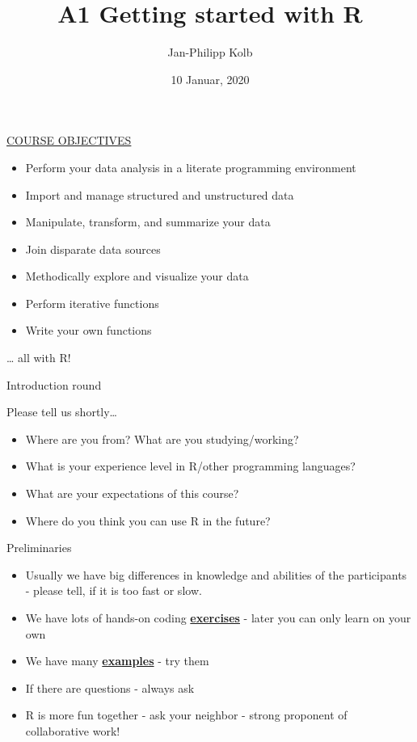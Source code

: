 \documentclass[
  10pt,
  ignorenonframetext,
]{beamer}
\title{A1 Getting started with R}
\author{Jan-Philipp Kolb}
\date{10 Januar, 2020}
\providecommand{\tightlist}{%
  \setlength{\itemsep}{0pt}\setlength{\parskip}{0pt}}
\begin{document}
\frame{\titlepage}

\begin{frame}{\href{http://uc-r.github.io/data_wrangling/week-1}{COURSE
OBJECTIVES}}
\protect\hypertarget{course-objectives}{}

\begin{itemize}
\tightlist
\item
  Perform your data analysis in a literate programming environment
\item
  Import and manage structured and unstructured data
\item
  Manipulate, transform, and summarize your data
\item
  Join disparate data sources
\item
  Methodically explore and visualize your data
\item
  Perform iterative functions
\item
  Write your own functions
\end{itemize}

\ldots{} all with R!

\end{frame}

\begin{frame}{Introduction round}
\protect\hypertarget{introduction-round}{}

\begin{block}{Please tell us shortly\ldots{}}

\begin{itemize}
\tightlist
\item
  Where are you from? What are you studying/working?
\item
  What is your experience level in R/other programming languages?
\item
  What are your expectations of this course?
\item
  Where do you think you can use R in the future?
\end{itemize}

\end{block}

\end{frame}

\begin{frame}{Preliminaries}
\protect\hypertarget{preliminaries}{}

\begin{itemize}
\tightlist
\item
  Usually we have big differences in knowledge and abilities of the
  participants - please tell, if it is too fast or slow.
\item
  We have lots of hands-on coding
  \href{http://web.math.ku.dk/~helle/R-intro/exercises.pdf}{\textbf{exercises}}
  - later you can only learn on your own
\item
  We have many \href{https://www.showmeshiny.com/}{\textbf{examples}} -
  try them
\item
  If there are questions - always ask
\item
  R is more fun together - ask your neighbor - strong proponent of
  collaborative work!
\end{itemize}

\end{frame}
\end{document}
